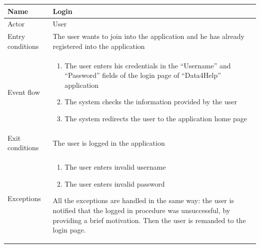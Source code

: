 \begin{table}[H]
\begin{tabularx}{\textwidth}{|l|X|}
\hline
 Name & Login \\ \hline
 Actor & User \\ \hline
 Entry conditions & The user wants to join into the application and he has already registered into the application\\ \hline
 Event flow & 
 \begin{enumerate}
 	\item The user enters his credentials in the “Username” and “Password” fields of the login page of “Data4Help” application 
  	\item The system checks the information provided by the user
 	\item The system redirects the user to the application home page
 \end{enumerate}   \\ \hline
 Exit conditions & The user is logged in the application \\ \hline
 Exceptions &  
 \begin{enumerate}
 	\item The user enters invalid username
 	\item The user enters invalid password 
 \end{enumerate}
 All the exceptions are handled in the same way: the user is notified that the logged in procedure was unsuccessful, by providing a brief motivation. Then the user is remanded to the login page.
 \\ \hline
\end{tabularx}
\end{table}